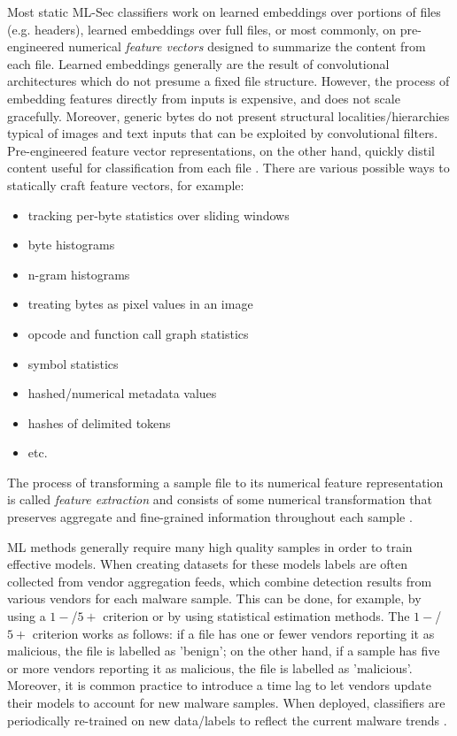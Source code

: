 \documentclass[pdfa%
,cucitura%
]{toptesi}
\begin{document}
Most static ML-Sec classifiers work on learned embeddings over portions of files (e.g. headers), learned embeddings over full files, or most commonly, on pre-engineered numerical \textit{feature vectors} designed to summarize the content from each file. Learned embeddings generally are the result of convolutional architectures which do not presume a fixed file structure. However, the process of embedding features directly from inputs is expensive, and does not scale gracefully. Moreover, generic bytes do not present structural localities/hierarchies typical of images and text inputs that can be exploited by convolutional filters. Pre-engineered feature vector representations, on the other hand, quickly distil content useful for classification from each file \cite{KyadigeLFCEIFPIBMD}. There are various possible ways to statically craft feature vectors, for example:
\begin{itemize}
	\item  tracking per-byte statistics over sliding windows
	
	\item byte histograms
	
	\item n-gram histograms
	
	\item treating bytes as pixel values in an image
	
	\item opcode and function call graph statistics
	
	\item symbol statistics
	
	\item hashed/numerical metadata values
	
	\item hashes of delimited tokens
	
	\item etc.
\end{itemize}
The process of transforming a sample file to its numerical feature representation is called \textit{feature extraction} and consists of some numerical transformation that preserves aggregate and fine-grained information throughout each sample \cite{ruddALOHA}.

ML methods generally require many high quality samples in order to train effective models. When creating datasets for these models labels are often collected from vendor aggregation feeds, which combine detection results from various vendors for each malware sample. This can be done, for example, by using a $1-$/$5+$ criterion or by using statistical estimation methods. The $1-$/$5+$ criterion works as follows: if a file has one or fewer vendors reporting it as malicious, the file is labelled as 'benign'; on the other hand, if a sample has five or more vendors reporting it as malicious, the file is labelled as 'malicious'. Moreover, it is common practice to introduce a time lag to let vendors update their models to account for new malware samples. When deployed, classifiers are periodically re-trained on new data/labels to reflect the current malware trends \cite{KyadigeLFCEIFPIBMD}.
\end{document}
